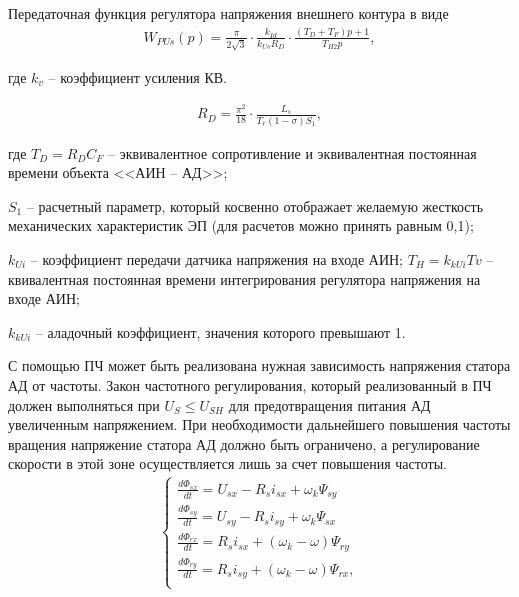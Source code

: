         Передаточная функция регулятора напряжения внешнего контура в виде
        \begin{gather*}
            W_{PUs}(p)=\frac{\pi}{2\sqrt{3}}\cdot\frac{k_{Id}}{k_{Us}R_D} \cdot
                \frac{(T_D + T_F) p+1}{T_{H2}p},
        \end{gather*}

        где $k_v$ -- коэффициент усиления КВ.

        \begin{gather*}
            R_D = \frac{\pi^2}{18} \cdot \frac{L_s}{T_r(1 - \sigma)S_1},
        \end{gather*}

        где $T_D=R_D C_F$ -- эквивалентное сопротивление и эквивалентная
        постоянная времени объекта <<АИН -- АД>>;\par
        $S_1$ -- расчетный параметр,
        который косвенно отображает желаемую жесткость механических
        характеристик ЭП (для расчетов можно принять равным 0,1);\par
        $k_{Ui}$ -- коэффициент передачи датчика напряжения на входе АИН; 
        $T_H = k_{kUi}Tv$ --квивалентная постоянная времени интегрирования
            регулятора напряжения на входе АИН;\par
        $k_{kUi}$ -- аладочный коэффициент, значения которого превышают 1. 

        С помощью ПЧ может быть реализована нужная зависимость напряжения
        статора АД от частоты. Закон частотного регулирования, который
        реализованный в ПЧ должен выполняться при $U_S \leq U_{SH}$ для
        предотвращения питания АД увеличенным напряжением. При необходимости
        дальнейшего повышения частоты вращения напряжение статора АД должно
        быть ограничено, а регулирование скорости в этой зоне осуществляется
        лишь за счет повышения частоты.
        \begin{gather*}
            \left\{
            \begin{aligned}
                \frac{d\Phi_{sx}}{dt} = U_{sx} - R_s i_{sx} + \omega_k \Psi_{sy}\\
                \frac{d\Phi_{sy}}{dt} = U_{sy} - R_s i_{sy} + \omega_k \Psi_{sx}\\
                \frac{d\Phi_{rx}}{dt} = R_s i_{sx} + (\omega_k-\omega) \Psi_{ry}\\
                \frac{d\Phi_{ry}}{dt} = R_s i_{sy} + (\omega_k-\omega) \Psi_{rx},\\
            \end{aligned}
            \right.
        \end{gather*}

